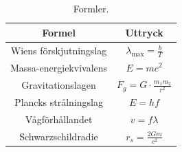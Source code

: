 \begin{table}[h!]
    \def\arraystretch{1.5}
    \centering
    \caption{Formler.}\vspace{5pt}
    \begin{tabular}{c | c}
        \textbf{Formel} & \textbf{Uttryck} \\ \midrule
        Wiens förskjutningslag & $\displaystyle \lambda_\text{max} = \frac{b}{T}$ \\
        Massa-energiekvivalens & $\displaystyle E = mc^2$ \\
        Gravitationslagen & $\displaystyle F_g = G\cdot\frac{m_1m_2}{r^2}$ \\
        Plancks strålningslag & $\displaystyle E = hf$ \\
        Vågförhållandet & $\displaystyle v = f\lambda$ \\
        Schwarzschildradie & $\displaystyle r_s = \frac{2Gm}{c^2}$ \\
    \end{tabular}

\end{table}